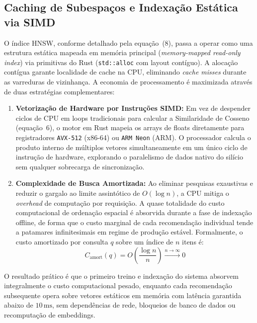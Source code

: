 \documentclass[11pt,a4paper]{article}
\begin{document}
\subsection{Caching de Subespaços e Indexação Estática via SIMD}

O índice HNSW, conforme detalhado pela equação~(8), passa a operar como uma estrutura estática
mapeada em memória principal (\textit{memory-mapped read-only index}) via primitivas do Rust
(\texttt{std::alloc} com layout contíguo). A alocação contígua garante localidade de cache na CPU,
eliminando \textit{cache misses} durante as varreduras de vizinhança. A economia de processamento
é maximizada através de duas estratégias complementares:

\begin{enumerate}
    \item \textbf{Vetorização de Hardware por Instruções SIMD:} Em vez de despender ciclos de CPU
    em loops tradicionais para calcular a Similaridade de Cosseno (equação~6), o motor em Rust
    mapeia os arrays de floats diretamente para registradores \texttt{AVX-512} (x86-64) ou
    \texttt{ARM Neon} (ARM). O processador calcula o produto interno de múltiplos vetores
    simultaneamente em um único ciclo de instrução de hardware, explorando o paralelismo de dados
    nativo do silício sem qualquer sobrecarga de sincronização.

    \item \textbf{Complexidade de Busca Amortizada:} Ao eliminar pesquisas exaustivas e reduzir o
    gargalo ao limite assintótico de $O(\log n)$, a CPU mitiga o \textit{overhead} de computação
    por requisição. A quase totalidade do custo computacional de ordenação espacial é absorvida
    durante a fase de indexação offline, de forma que o custo marginal de cada recomendação
    individual tende a patamares infinitesimais em regime de produção estável. Formalmente, o
    custo amortizado por consulta $q$ sobre um índice de $n$ itens é:
    \begin{equation}
    C_{\text{amort}}(q) = O\!\left(\frac{\log n}{n}\right) \xrightarrow{n \to \infty} 0
    \end{equation}
\end{enumerate}

O resultado prático é que o primeiro treino e indexação do sistema absorvem integralmente o custo
computacional pesado, enquanto cada recomendação subsequente opera sobre vetores estáticos em
memória com latência garantida abaixo de $10\,\text{ms}$, sem dependências de rede, bloqueios de
banco de dados ou recomputação de embeddings.
\end{document}
